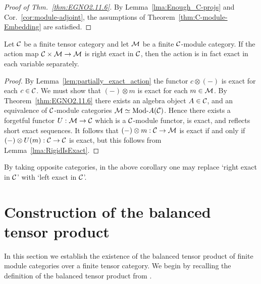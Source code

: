 \documentclass{amsart}
\begin{document}
\begin{proof}[Proof of Thm.~\ref{thm:EGNO2.11.6}]
By Lemma~\ref{lma:Enough_C-projs} and Cor.~\ref{cor:module-adjoint}, the assumptions of Theorem~\ref{thm:C-module-Embedding} are satisfied.
\end{proof}

\begin{corollary} \label{cor:biexact_action}
	Let $\mathcal C$ be a finite tensor category and let $\mathcal M$ be a finite $\mathcal C$-module category. If the action map $\mathcal C \times \mathcal M \to \mathcal M$ is right exact in $\mathcal C$, then the action is in fact exact in each variable separately.  
\end{corollary}

\begin{proof}
	By Lemma~\ref{lem:partially_exact_action} the functor $c \otimes (-)$ is exact for each $c \in \mathcal C$. We must show that $(-) \otimes m$ is exact for each $m \in \mathcal M$. By Theorem~\ref{thm:EGNO2.11.6} there exists an algebra object $A \in \mathcal C$, and an equivalence of $\mathcal C$-module categories $\cM \simeq \Mod{}{A}(\cC)$. Hence there exists a forgetful functor $U:\mathcal M \to \mathcal C$ which is a $\mathcal C$-module functor, is exact, and reflects short exact sequences. It follows that $(-) \otimes m: \mathcal C \to \mathcal M$ is exact if and only if $(-) \otimes U(m): \mathcal C \to \mathcal C$ is exact, but this follows from Lemma~\ref{lma:RigidIsExact}. 
\end{proof}

\begin{remark}
	By taking opposite categories, in the above corollary one may replace `right exact in $\mathcal C$' with `left exact in $\mathcal C$'. 
\end{remark}


\section{Construction of the balanced tensor product} \label{sec:tc-deligne}

In this section we establish the existence of the balanced tensor product of finite module categories over a finite tensor category.  We begin by recalling the definition of the balanced tensor product from \cite{0909.3140}.
\end{document}
